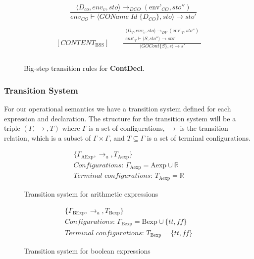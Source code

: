 \begin{figure}[htbp]
	\centering
	\begin{gather*}
		[GAMEOBJECT_\text{BSS}] 
		\qquad \dfrac
		{\langle D_{co}, env_v, sto\rangle \rightarrow_{DCO} (\text{env'}_{CO}, sto'')}
		{env_{CO} \vdash \langle GOName \; Id \; \{D_{CO}\}, sto\rangle\rightarrow sto'}
		\\
		\\
		[CONTENT_\text{BSS}] 
		\qquad \frac
		{
			\begin{gathered}
				\langle D_V, env_v, sto\rangle \rightarrow_{DV} (\text{env'}_V, sto'') \\ 
				env'_V \vdash \langle S, sto''\rangle \rightarrow sto'
			\end{gathered}
		}
		{\langle GOCont \{S\}, s\rangle\rightarrow s'}
		\\
		\\
	\end{gather*}
	\caption{Big-step transition rules for \textbf{ContDecl}.}
	\label{fig:BssStm}
\end{figure}


\subsubsection*{Transition System}

For our operational semantics we have a transition system defined for each expression and declaration. 
The structure for the transition system will be a triple $(\Gamma,\rightarrow,T)$ where $\Gamma$ is a set of configurations, $\rightarrow$ is the transition relation, which is a subset of $\Gamma\times\Gamma$, and $T\subseteq \Gamma$ is a set of terminal configurations. \cite{huttelTransitionsTreesIntroduction2010}


\begin{figure}
	\begin{gather*} 
		\{ \Gamma_\text{AExp}, \rightarrow_a, T_\text{Aexp} \} \\ 
		\textit{Configurations: } \Gamma_\text{Aexp} = \text{Aexp} \cup \mathbb{R} \\ 
		\textit{Terminal configurations: } T_\text{Aexp} = \mathbb{R}
	\end{gather*}
	\label{fig:TS_Aexp}
	\caption{Transition system for arithmetic expressions}
\end{figure}

\begin{figure}
	\begin{gather*} 
		\{ \Gamma_\text{BExp}, \rightarrow_a, T_\text{Bexp} \} \\ 
		\textit{Configurations: } \Gamma_\text{Bexp} = \text{Bexp} \cup \{tt, f\!f\} \\ 
		\textit{Terminal configurations: } T_\text{Bexp} = \{tt, f\!f\}
	\end{gather*}
	\label{fig:TS_Bexp}
	\caption{Transition system for boolean expressions}
\end{figure}

